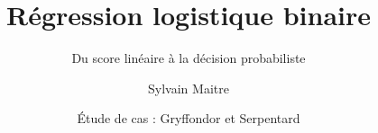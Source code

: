 \documentclass[11pt,aspectratio=169]{beamer}
\title{Régression logistique binaire}
\subtitle{Du score linéaire à la décision probabiliste}
\author{Sylvain Maitre}
\date{Étude de cas : Gryffondor et Serpentard}
\newcounter{coursechapter}
\newcommand{\coursechapterindicator}{}
\newcommand{\coursepartshort}{Vue d'ensemble}
\newcommand{\coursepartposition}{Vue d'ensemble}
\newcommand{\coursepartindex}{0}
\newcommand{\coursepartcolor}{courseproblem}
\newif\ifcoursenavigationvisible
\newcommand{\coursefinishstage}{}
\newcommand{\courseintro}{%
  \coursefinishstage
  \coursenavigationvisiblefalse
  \gdef\coursechapterindicator{}%
  \gdef\coursepartshort{Introduction}%
  \gdef\coursepartposition{Introduction}%
  \gdef\coursepartindex{0}%
  \gdef\coursepartcolor{courseproblem}}
\begin{document}
\begin{frame}[plain]
  \titlepage
\end{frame}



\courseintro
\end{document}
